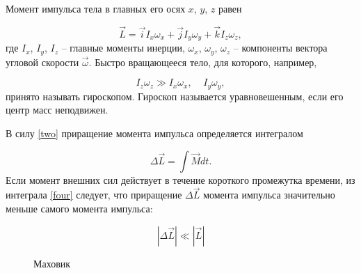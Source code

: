 \documentclass[a4paper, 12pt]{article}%
\begin{document}
	Момент импульса тела в главных его осях $x$, $y$, $z$ равен
	
	\begin{equation}
		\vec{L} = \vec{i}I_x\omega_x+\vec{j}I_y\omega_y+\vec{k}I_z\omega_z,
		\label{three}
	\end{equation}
	где $ I_x $, $ I_y $, $ I_z $ -- главные моменты инерции, $ \omega_x $, $ \omega_y $, $ \omega_z $ -- компоненты вектора угловой скорости $ \vec{\omega} $. Быстро вращающееся тело, для которого, например,
	
	\begin{equation}
		I_z\omega_z \gg I_x\omega_x,\;\;\;\;I_y\omega_y,
	\end{equation} 
	принято называть гироскопом. Гироскоп называется уравновешенным, если его центр масс неподвижен.
	
	В силу \eqref{two} приращение момента импульса определяется интегралом
	
	\begin{equation}
		\Delta\vec{L} = \int\vec{M} dt.
		\label{four}
	\end{equation}
	Если момент внешних сил действует в течение короткого промежутка времени, из интеграла \eqref{four} следует, что приращение $ \Delta \vec{L} $ момента импульса значительно меньше самого момента импульса:
	
	\begin{equation}
		\left|\Delta \vec{L}\right| \ll \left|\vec{L}\right| 
	\end{equation}
	
	\begin{figure}[h]
		\caption{Маховик}
	\end{figure}
	
\end{document}

